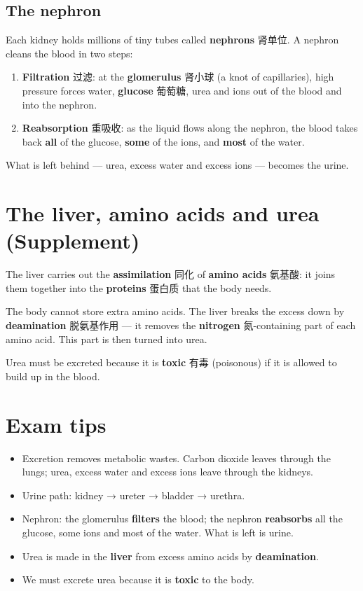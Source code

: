 \documentclass[11pt]{article}
\begin{document}
\subsection*{The nephron}

Each kidney holds millions of tiny tubes called \textbf{nephrons} 肾单位. A nephron cleans the blood in two steps:

\begin{enumerate}
\item \textbf{Filtration} 过滤: at the \textbf{glomerulus} 肾小球 (a knot of capillaries), high pressure forces water, \textbf{glucose} 葡萄糖, urea and ions out of the blood and into the nephron.

\item \textbf{Reabsorption} 重吸收: as the liquid flows along the nephron, the blood takes back \textbf{all} of the glucose, \textbf{some} of the ions, and \textbf{most} of the water.

\end{enumerate}

What is left behind — urea, excess water and excess ions — becomes the urine.

\section*{The liver, amino acids and urea (Supplement)}

The liver carries out the \textbf{assimilation} 同化 of \textbf{amino acids} 氨基酸: it joins them together into the \textbf{proteins} 蛋白质 that the body needs.

The body cannot store extra amino acids. The liver breaks the excess down by \textbf{deamination} 脱氨基作用 — it removes the \textbf{nitrogen} 氮-containing part of each amino acid. This part is then turned into urea.

Urea must be excreted because it is \textbf{toxic} 有毒 (poisonous) if it is allowed to build up in the blood.

\section*{Exam tips}

\begin{itemize}
\item Excretion removes metabolic wastes. Carbon dioxide leaves through the lungs; urea, excess water and excess ions leave through the kidneys.

\item Urine path: kidney → ureter → bladder → urethra.

\item Nephron: the glomerulus \textbf{filters} the blood; the nephron \textbf{reabsorbs} all the glucose, some ions and most of the water. What is left is urine.

\item Urea is made in the \textbf{liver} from excess amino acids by \textbf{deamination}.

\item We must excrete urea because it is \textbf{toxic} to the body.

\end{itemize}
\end{document}
